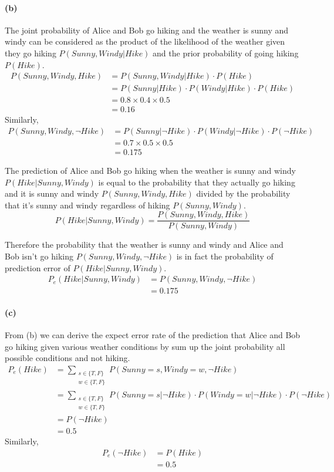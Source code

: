 \documentclass[a4paper]{article}
\begin{document}
\paragraph{(b)} The joint probability of Alice and Bob go hiking and the weather is sunny and windy can be considered as the product of the likelihood of the weather given they go hiking $P(Sunny, Windy | Hike)$ and the prior probability of going hiking $P(Hike)$.\\
	\begin{align}
		P(Sunny, Windy, Hike) &= P(Sunny, Windy | Hike) \cdot P(Hike)\\
			&= P(Sunny | Hike) \cdot P(Windy | Hike) \cdot P(Hike)\\
			&= 0.8 \times 0.4 \times 0.5\\
			&= 0.16
	\end{align}
	Similarly,
	\begin{align}
		P(Sunny, Windy, \neg Hike) &= P(Sunny | \neg Hike) \cdot P(Windy | \neg Hike) \cdot P(\neg Hike)\\
			&= 0.7 \times 0.5 \times 0.5\\
			&= 0.175
	\end{align}
	
	The prediction of Alice and Bob go hiking when the weather is sunny and windy $P(Hike|Sunny, Windy)$ is equal to the probability that they actually go hiking and it is sunny and windy $P(Sunny, Windy, Hike)$ divided by the probability that it's sunny and windy regardless of hiking $P(Sunny, Windy)$.
	$$ P(Hike|Sunny, Windy) = \frac{P(Sunny, Windy, Hike)}{P(Sunny, Windy)} $$
	
	Therefore the probability that the weather is sunny and windy and Alice and Bob isn't go hiking $P(Sunny, Windy, \neg Hike)$ is in fact the probability of prediction error of $P(Hike|Sunny, Windy)$. 
	\begin{align}
		P_e(Hike|Sunny, Windy) &= P(Sunny, Windy,\neg Hike) \\
			&= 0.175
	\end{align}
\paragraph{(c)} From (b) we can derive the expect error rate of the prediction that Alice and Bob go hiking given various weather conditions by sum up the joint probability all possible conditions and not hiking.
	\begin{align}
		P_e(Hike) &= \sum_{\substack{
			s \in \{T, F\}\\
			w \in \{T, F\}}} P(Sunny=s, Windy=w, \neg Hike) \\
			&= \sum_{\substack{
			s \in \{T, F\}\\
			w \in \{T, F\}}} P(Sunny=s|\neg Hike) \cdot P(Windy=w|\neg Hike) \cdot P(\neg Hike)\\
			&= P(\neg Hike) \\
			&= 0.5
	\end{align}
	Similarly,
	\begin{align}
		P_e(\neg Hike) &= P(Hike) \\
			&= 0.5
	\end{align}
\end{document}
